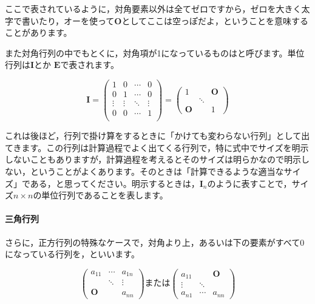 \documentclass{ltjsbook}
\begin{document}
ここで表されているように，対角要素以外は全てゼロですから，ゼロを大きく太字で書いたり，オーを使って$\bm{O}$としてここは空っぽだよ，ということを意味することがあります。

また対角行列の中でもとくに，対角項が1になっているものはと呼びます。単位行列は$\bm{I}$とか
$\bm{E}$で表されます。


\begin{equation*}
    \bm{I} =
    \begin{pmatrix}
        1      & 0      & \cdots & 0      \\
        0      & 1      & \cdots & 0      \\
        \vdots & \vdots & \ddots & \vdots \\
        0      & 0      & \cdots & 1      \\
    \end{pmatrix} =
    \begin{pmatrix}
        1      &        & \bm{O} \\
               & \ddots          \\
        \bm{O} &        & 1
    \end{pmatrix}
\end{equation*}


これは後ほど，行列で掛け算をするときに「かけても変わらない行列」として出てきます。この行列は計算過程でよく出てくる行列で，特に式中でサイズを明示しないこともありますが，計算過程を考えるとそのサイズは明らかなので明示しない，ということがよくあります。そのときは「計算できるような適当なサイズ」である，と思ってください。明示するときは，$\bm{I}_n$のように表すことで，サイズ$n \times n$の単位行列であることを表します。

\paragraph{三角行列}
さらに，正方行列の特殊なケースで，対角より上，あるいは下の要素がすべて$0$になっている行列を，といいます。

\begin{equation*}
    \begin{pmatrix}
        a_{11} & \cdots & a_{1n} \\
               & \ddots & \vdots \\
        \bm{O} &        & a_{nn}
    \end{pmatrix}\text{または}
    \begin{pmatrix}
        a_{11} &        & \bm{O} \\
        \vdots & \ddots &        \\
        a_{n1} & \cdots & a_{nn}
    \end{pmatrix}
\end{equation*}
\end{document}
